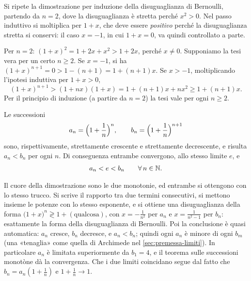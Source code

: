 \begin{strategia}
Si ripete la dimostrazione per induzione della disuguaglianza di Bernoulli, partendo da
$n=2$, dove la disuguaglianza è stretta perché $x^{2}>0$. Nel passo induttivo si
moltiplica per $1+x$, che deve essere \emph{positivo} perché la disuguaglianza stretta
si conservi: il caso $x=-1$, in cui $1+x=0$, va quindi controllato a parte.
\end{strategia}

\begin{dimostrazione}
Per $n=2$: $(1+x)^{2}=1+2x+x^{2}>1+2x$, perché $x\neq0$. Supponiamo la tesi vera per un
certo $n\ge2$. Se $x=-1$, si ha $(1+x)^{n+1}=0>1-(n+1)=1+(n+1)x$. Se $x>-1$, moltiplicando
l'ipotesi induttiva per $1+x>0$,
\[
  (1+x)^{n+1}>(1+nx)(1+x)=1+(n+1)x+nx^{2}\ge1+(n+1)x .
\]
Per il principio di induzione (a partire da $n=2$) la tesi vale per ogni $n\ge2$.
\end{dimostrazione}

\begin{teorema}\label{teo:numero-e}
Le successioni
\begin{equation}\label{eq:an-bn}
  a_{n}=\Bigl(1+\frac1n\Bigr)^{n}, \qquad b_{n}=\Bigl(1+\frac1n\Bigr)^{n+1}
\end{equation}
sono, rispettivamente, strettamente crescente e strettamente decrescente, e risulta
$a_{n}<b_{n}$ per ogni $n$. Di conseguenza entrambe convergono, allo stesso limite $e$, e
\begin{equation}\label{eq:e-stima}
  a_{n}<e<b_{n} \qquad\forall\, n\in\mathbb{N} .
\end{equation}
\end{teorema}

\begin{schema}
\end{schema}

\begin{strategia}
Il cuore della dimostrazione sono le due monotonie, ed entrambe si ottengono con lo
stesso trucco. Si scrive il rapporto tra due termini consecutivi, si mettono insieme le
potenze con lo stesso esponente, e si ottiene una disuguaglianza della forma
$\bigl(1+x\bigr)^{n}\gtrless1+(\text{qualcosa})$, con $x=-\frac1{n^{2}}$ per $a_{n}$ e
$x=\frac1{n^{2}-1}$ per $b_{n}$: esattamente la forma della disuguaglianza di Bernoulli.
Poi la conclusione è quasi automatica: $a_{n}$ cresce, $b_{n}$ decresce, e $a_{n}<b_{n}$;
quindi ogni $a_{n}$ è minore di ogni $b_{m}$ (una «tenaglia» come quella di Archimede nel
\cref{sec:premessa-limiti}). In particolare $a_{n}$ è limitata superiormente da $b_{1}=4$,
e il teorema sulle successioni monotòne dà la convergenza. Che i due limiti coincidano
segue dal fatto che $b_{n}=a_{n}(1+\frac1n)$ e $1+\frac1n\to1$.
\end{strategia}

